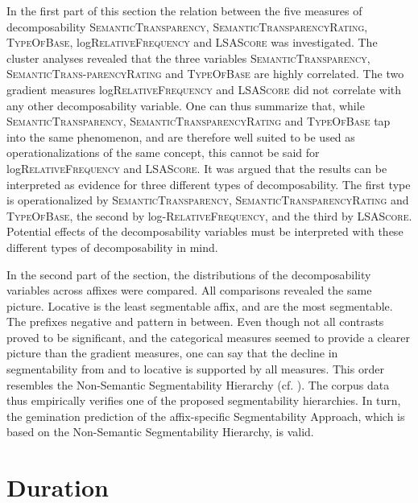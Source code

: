 In the first part of this section the relation between the five measures of decomposability \textsc{SemanticTransparency}, \textsc{SemanticTransparencyRating}, \textsc{TypeOfBase}, log\textsc{RelativeFrequency} and \textsc{LSAScore} was investigated. The cluster analyses revealed that the three variables \textsc{SemanticTransparency}, \textsc{SemanticTrans-parencyRating} and \textsc{TypeOfBase} are highly correlated. The two gradient measures  log\textsc{RelativeFrequency} and \textsc{LSAScore}  did not correlate with any other decomposability variable.  
One can thus summarize that, while  \textsc{SemanticTransparency}, \textsc{SemanticTransparencyRating} and \textsc{TypeOfBase} tap into the same phenomenon, and are therefore well suited to be used as operationalizations of the same concept, this cannot be said for 
log\textsc{RelativeFrequency} and \textsc{LSAScore}. 
It was argued that the results can be interpreted as evidence for three different types of decomposability. The first type is operationalized by  \textsc{SemanticTransparency}, \textsc{SemanticTransparencyRating} and \textsc{TypeOfBase}, the second by log-\textsc{RelativeFrequency}, and the third by \textsc{LSAScore}. Potential effects of the decomposability variables must be interpreted with these different types of decomposability in mind. 

 In the second part of the section, the distributions of the decomposability variables across affixes were compared. All comparisons revealed the same picture. Locative  is the least segmentable affix,  and  are the most segmentable. The prefixes negative  and  pattern in between. 
 Even though not all contrasts proved to be significant, and the categorical measures seemed to provide a clearer picture than the gradient measures, one can say that the decline in segmentability from  and  to locative  is supported by all measures. 
 This order resembles the Non-Semantic Segmentability Hierarchy (cf.  ). The corpus data thus empirically verifies one of the proposed segmentability hierarchies. In turn, the gemination prediction of the affix-specific Segmentability Approach, which is based on the Non-Semantic Segmentability Hierarchy, is valid. 

\section{Duration}


